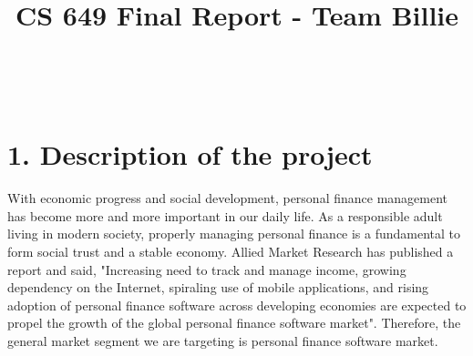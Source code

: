 \documentclass{sigchi}
\def\plaintitle{CS 649 Final Report - Team Billie}
\begin{document}
\title{\plaintitle}

\author{%
  \\
\\
}

\maketitle

\section{1. Description of the project}

With economic progress and social development, personal finance management has become more and more important in our daily life. As a responsible adult living in modern society, properly managing personal finance is a fundamental to form social trust and a stable economy. Allied Market Research has published a report \cite{AMR} and said, "Increasing need to track and manage income, growing dependency on the Internet, spiraling use of mobile applications, and rising adoption of personal finance software across developing economies are expected to propel the growth of the global personal finance software market". Therefore, the general market segment we are targeting is personal finance software market.
\end{document}
